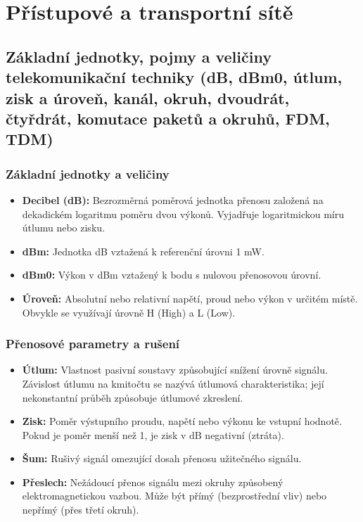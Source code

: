 
\section{Přístupové a transportní sítě}
\subsection{Základní jednotky, pojmy a veličiny telekomunikační  techniky (dB, dBm0, útlum, zisk a úroveň, kanál, okruh, dvoudrát,                      čtyřdrát, komutace paketů a okruhů, FDM, TDM)}

    \subsubsection{Základní jednotky a veličiny}
        \begin{itemize}
            \item \textbf{Decibel (dB):} Bezrozměrná poměrová jednotka přenosu založená na dekadickém logaritmu poměru dvou výkonů. Vyjadřuje logaritmickou míru útlumu nebo zisku.
            \item \textbf{dBm:} Jednotka dB vztažená k referenční úrovni 1 mW.
            \item \textbf{dBm0:} Výkon v dBm vztažený k bodu s nulovou přenosovou úrovní.
            \item \textbf{Úroveň:} Absolutní nebo relativní napětí, proud nebo výkon v určitém místě. Obvykle se využívají úrovně H (High) a L (Low).
        \end{itemize}
    \subsubsection{Přenosové parametry a rušení}
        \begin{itemize}
            \item \textbf{Útlum:} Vlastnost pasivní soustavy způsobující snížení úrovně signálu. Závislost útlumu na kmitočtu se nazývá útlumová charakteristika; její nekonstantní průběh způsobuje útlumové zkreslení.
            \item \textbf{Zisk:} Poměr výstupního proudu, napětí nebo výkonu ke vstupní hodnotě. Pokud je poměr menší než 1, je zisk v dB negativní (ztráta).
            \item \textbf{Šum:} Rušivý signál omezující dosah přenosu užitečného signálu.
            \item \textbf{Přeslech:} Nežádoucí přenos signálu mezi okruhy způsobený elektromagnetickou vazbou. Může být přímý (bezprostřední vliv) nebo nepřímý (přes třetí okruh).
        \end{itemize}

